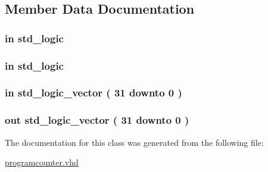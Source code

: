 \subsection{\-Member \-Data \-Documentation}
\hypertarget{classpc_a66122f468837e0c758d57582b68eb123}{
\subsubsection[{clk}]{ {\bfseries in } {\bfseries std\-\_\-logic } }}\label{classpc_a66122f468837e0c758d57582b68eb123}
\hypertarget{classpc_ab46b7d3d37e6c21a29a6f2a207682d72}{
\subsubsection[{reset}]{ {\bfseries in } {\bfseries std\-\_\-logic } }}\label{classpc_ab46b7d3d37e6c21a29a6f2a207682d72}
\hypertarget{classpc_add4c01f1cc397a05cf5ad7aa3b694cea}{
\subsubsection[{\-P\-C\-\_\-in}]{ {\bfseries in } {\bfseries std\-\_\-logic\-\_\-vector (   31    downto    0  ) } }}\label{classpc_add4c01f1cc397a05cf5ad7aa3b694cea}
\hypertarget{classpc_ad400ac7e764014280c356d0bc1034caa}{
\subsubsection[{\-P\-C\-\_\-out}]{ {\bfseries out } {\bfseries std\-\_\-logic\-\_\-vector (   31    downto    0  ) } }}\label{classpc_ad400ac7e764014280c356d0bc1034caa}


\-The documentation for this class was generated from the following file\-:\begin{DoxyCompactItemize}
\item 
\hyperlink{programcounter_8vhd}{programcounter.\-vhd}\end{DoxyCompactItemize}
